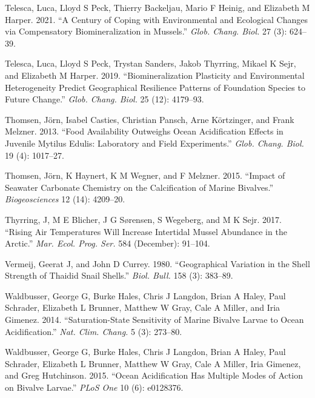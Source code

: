 \documentclass[smallextended]{svjour3}       %
\newlength{\cslhangindent}
\newenvironment{CSLReferences}[2] %
 {%
  \setlength{\parindent}{0pt}
  \ifodd #1 \everypar{\setlength{\hangindent}{\cslhangindent}}\ignorespaces\fi
  \ifnum #2 > 0
  \setlength{\parskip}{#2\baselineskip}
  \fi
 }%
 {}
\begin{document}
\begin{CSLReferences}{1}{0}
\leavevmode{}%
Telesca, Luca, Lloyd S Peck, Thierry Backeljau, Mario F Heinig, and
Elizabeth M Harper. 2021. {``A Century of Coping with Environmental and
Ecological Changes via Compensatory Biomineralization in Mussels.''}
\emph{Glob. Chang. Biol.} 27 (3): 624--39.

\leavevmode{}%
Telesca, Luca, Lloyd S Peck, Trystan Sanders, Jakob Thyrring, Mikael K
Sejr, and Elizabeth M Harper. 2019. {``Biomineralization Plasticity and
Environmental Heterogeneity Predict Geographical Resilience Patterns of
Foundation Species to Future Change.''} \emph{Glob. Chang. Biol.} 25
(12): 4179--93.

\leavevmode{}%
Thomsen, Jörn, Isabel Casties, Christian Pansch, Arne Körtzinger, and
Frank Melzner. 2013. {``Food Availability Outweighs Ocean Acidification
Effects in Juvenile Mytilus Edulis: Laboratory and Field Experiments.''}
\emph{Glob. Chang. Biol.} 19 (4): 1017--27.

\leavevmode{}%
Thomsen, Jörn, K Haynert, K M Wegner, and F Melzner. 2015. {``Impact of
Seawater Carbonate Chemistry on the Calcification of Marine Bivalves.''}
\emph{Biogeosciences} 12 (14): 4209--20.

\leavevmode{}%
Thyrring, J, M E Blicher, J G Sørensen, S Wegeberg, and M K Sejr. 2017.
{``Rising Air Temperatures Will Increase Intertidal Mussel Abundance in
the Arctic.''} \emph{Mar. Ecol. Prog. Ser.} 584 (December): 91--104.

\leavevmode{}%
Vermeij, Geerat J, and John D Currey. 1980. {``Geographical Variation in
the Shell Strength of Thaidid Snail Shells.''} \emph{Biol. Bull.} 158
(3): 383--89.

\leavevmode{}%
Waldbusser, George G, Burke Hales, Chris J Langdon, Brian A Haley, Paul
Schrader, Elizabeth L Brunner, Matthew W Gray, Cale A Miller, and Iria
Gimenez. 2014. {``Saturation-State Sensitivity of Marine Bivalve Larvae
to Ocean Acidification.''} \emph{Nat. Clim. Chang.} 5 (3): 273--80.

\leavevmode{}%
Waldbusser, George G, Burke Hales, Chris J Langdon, Brian A Haley, Paul
Schrader, Elizabeth L Brunner, Matthew W Gray, Cale A Miller, Iria
Gimenez, and Greg Hutchinson. 2015. {``Ocean Acidification Has Multiple
Modes of Action on Bivalve Larvae.''} \emph{PLoS One} 10 (6): e0128376.


\end{CSLReferences}
\end{document}
